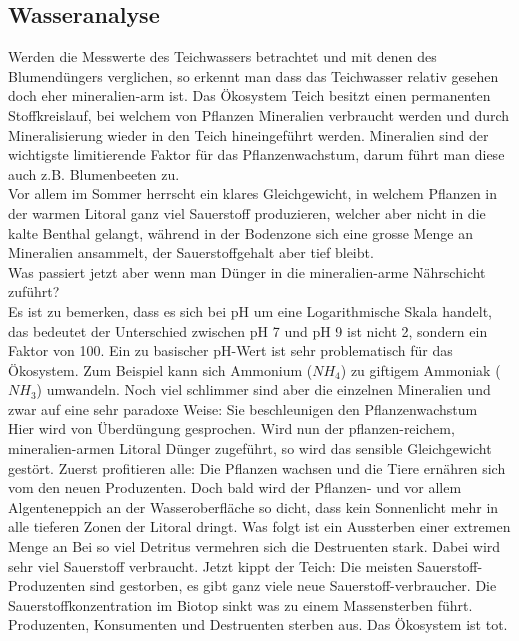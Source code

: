 \documentclass{article}
\begin{document}
    \subsection{Wasseranalyse}
        
        Werden die Messwerte des Teichwassers betrachtet und mit denen des Blumendüngers verglichen, so erkennt man dass das Teichwasser relativ gesehen doch eher mineralien-arm ist. Das Ökosystem Teich besitzt einen permanenten Stoffkreislauf, bei welchem von Pflanzen Mineralien verbraucht werden und durch Mineralisierung wieder in den Teich hineingeführt werden. Mineralien sind der wichtigste limitierende Faktor für das Pflanzenwachstum, darum führt man diese auch z.B. Blumenbeeten zu. \\
        \vspace{5mm}
        Vor allem im Sommer herrscht ein klares Gleichgewicht, in welchem Pflanzen in der warmen Litoral ganz viel Sauerstoff produzieren, welcher aber nicht in die kalte Benthal gelangt, während in der Bodenzone sich eine grosse Menge an Mineralien ansammelt, der Sauerstoffgehalt aber tief bleibt. \\
        \vspace{5mm}
        Was passiert jetzt aber wenn man Dünger in die mineralien-arme Nährschicht zuführt? \\
        Es ist zu bemerken, dass es sich bei pH um eine Logarithmische Skala handelt, das bedeutet der Unterschied zwischen pH 7 und pH 9 ist nicht 2, sondern ein Faktor von 100. Ein zu basischer pH-Wert ist sehr problematisch für das Ökosystem. Zum Beispiel kann sich Ammonium ($NH_4$) zu giftigem Ammoniak ($NH_3$) umwandeln.\cite{Teichpflege} Noch viel schlimmer sind aber die einzelnen Mineralien und zwar auf eine sehr paradoxe Weise: Sie beschleunigen den Pflanzenwachstum \\
        \vspace{5mm}
        Hier wird von Überdüngung gesprochen. Wird nun der pflanzen-reichem, mineralien-armen Litoral Dünger zugeführt, so wird das sensible Gleichgewicht gestört. Zuerst profitieren alle: Die Pflanzen wachsen und die Tiere ernähren sich vom den neuen Produzenten. Doch bald wird der Pflanzen- und vor allem Algenteneppich an der Wasseroberfläche so dicht, dass kein Sonnenlicht mehr in alle tieferen Zonen der Litoral dringt. Was folgt ist ein Aussterben einer extremen Menge an 
        \vspace{5mm}
        Bei so viel Detritus vermehren sich die Destruenten stark. Dabei wird sehr viel Sauerstoff verbraucht. Jetzt kippt der Teich: Die meisten Sauerstoff-Produzenten sind gestorben, es gibt ganz viele neue Sauerstoff-verbraucher. Die Sauerstoffkonzentration im Biotop sinkt was zu einem Massensterben führt. Produzenten, Konsumenten und Destruenten sterben aus. Das Ökosystem ist tot. \cite{Planet1} \cite{Planet2} \\
\end{document}
